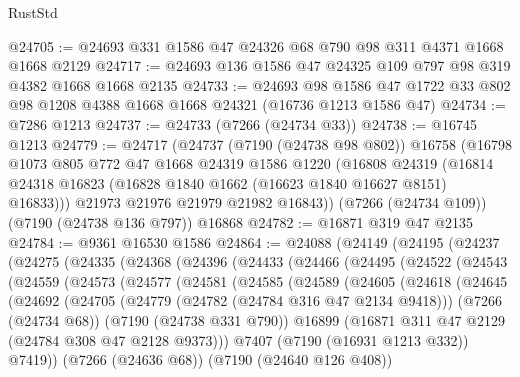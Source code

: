 \begin{lexlean}{RustStd}
\begin{coremodule}
@24705 := @24693 @331 @1586 @47 @24326 @68 @790 @98 @311 @4371 @1668 @1668 @2129
@24717 := @24693 @136 @1586 @47 @24325 @109 @797 @98 @319 @4382 @1668 @1668 @2135
@24733 := @24693
    @98
    @1586
    @47
    @1722
    @33
    @802
    @98
    @1208
    @4388
    @1668
    @1668
    @24321
    (@16736 @1213 @1586 @47)
@24734 := @7286 @1213
@24737 := @24733 (@7266 (@24734 @33))
@24738 := @16745 @1213
@24779 := @24717
    (@24737
      (@7190 (@24738 @98 @802))
      @16758
      (@16798
        @1073
        @805
        @772
        @47
        @1668
        @24319
        @1586
        @1220
        (@16808
          @24319
          (@16814 @24318 @16823 (@16828 @1840 @1662 (@16623 @1840 @16627 @8151) @16833)))
        @21973
        @21976
        @21979
        @21982
        @16843))
    (@7266 (@24734 @109))
    (@7190 (@24738 @136 @797))
    @16868
@24782 := @16871 @319 @47 @2135
@24784 := @9361 @16530 @1586
@24864 := @24088
    (@24149
      (@24195
        (@24237
          (@24275
            (@24335
              (@24368
                (@24396
                  (@24433
                    (@24466
                      (@24495
                        (@24522
                          (@24543
                            (@24559
                              (@24573
                                (@24577
                                  (@24581
                                    (@24585
                                      (@24589
                                        (@24605
                                          (@24618
                                            (@24645
                                              (@24692
                                                (@24705
                                                  (@24779 (@24782 (@24784 @316 @47 @2134 @9418)))
                                                  (@7266 (@24734 @68))
                                                  (@7190 (@24738 @331 @790))
                                                  @16899
                                                  (@16871
                                                    @311
                                                    @47
                                                    @2129
                                                    (@24784 @308 @47 @2128 @9373)))
                                                @7407
                                                (@7190 (@16931 @1213 @332))
                                                @7419))
                                            (@7266 (@24636 @68))
                                            (@7190 (@24640 @126 @408))

\end{coremodule}
\end{lexlean}
